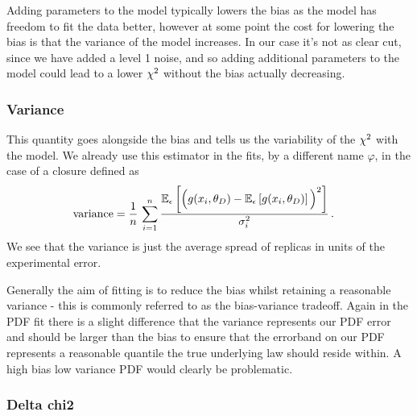 Adding parameters to the model
typically lowers the bias as the model has freedom to fit the data better, however at some point the
cost for lowering the bias is that the variance of the model increases. In our
case it's not as clear cut, since we have added a level 1 noise, and so adding
additional parameters to the model could lead to a lower $\chi^{2}$ without the bias
actually decreasing.

\subsubsection*{Variance}

This quantity goes alongside the bias and tells us the variability of the
$\chi^{2}$ with the model. We already use this estimator in the fits, by a
different name $\varphi$, in the case of a closure defined as
%
\begin{equation}
    \begin{split}
        \mathrm{variance} &= \frac{1}{n}\, \sum_{i=1}^{n} \frac{
            \mathbb{E}_{\epsilon}\left[\Big(g(x_i,\theta_D) -
            \mathbb{E}_{\epsilon}\left[g(x_i,\theta_D)\right]\Big)^2\right]
        }{\sigma_i^2} \, .
    \end{split}
\end{equation}
%
We see
that the variance is just the average spread of replicas in units of the
experimental error.

Generally the aim of fitting is to reduce the bias whilst retaining a reasonable
variance - this is commonly referred to as the bias-variance tradeoff. Again
in the PDF fit there is a slight difference that the variance represents our PDF
error and should be larger than the bias to ensure that the errorband on our
PDF represents a reasonable quantile the true underlying law should reside
within. A high bias low variance PDF would clearly be problematic.

\subsubsection*{Delta chi2}

